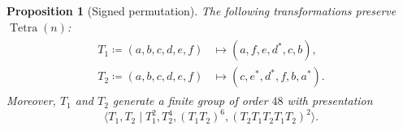 \documentclass[pdflatex, sn-mathphys-num]{sn-jnl} %
\makeatletter
\theoremstyle{plain}
\newtheorem{prop}[thm]{Proposition}
\theoremstyle{definition}
\DeclareMathOperator{\Tetra}{Tetra}
\newcommand{\ea}{a}
\newcommand{\eb}{b}
\newcommand{\ec}{c}
\newcommand{\ed}{d}
\newcommand{\ee}{e}
\newcommand{\ef}{f}
\newcommand{\tightoctuple}[1]{
\begingroup
\arraycolsep=0.5pt
\renewcommand{\arraystretch}{0.3}
\begin{array}{@{}c@{}cccccc@{}c@{}}#1\end{array}
\endgroup
}
\makeatother
\begin{document}
\begin{prop}[Signed permutation]
    \label{prop:tet_symmetry}
    The following transformations preserve $\Tetra(n)$:
    \begin{align}
        \label{eq:gens_of_tet_sym}
        \begin{split}
            T_1 \coloneqq (\ea, \eb, \ec, \ed, \ee, \ef)
            &\mapsto
            (\ea, \ef, \ee, \ed^{*}, \ec, \eb), \\
            T_2 \coloneqq (\ea, \eb, \ec, \ed, \ee, \ef)
            &\mapsto
            (\ec, \ee^*, \ed^{*}, \ef, \eb, \ea^*).
        \end{split}
    \end{align}
    Moreover, $T_1$ and $T_2$ generate a finite group of order $48$ with presentation
    \begin{equation}
        \langle T_1, T_2 \mid T_1^2, T_2^4, (T_1 T_2)^6, (T_2T_1T_2T_1T_2)^2 \rangle.
    \end{equation}

\end{prop}
\end{document}
